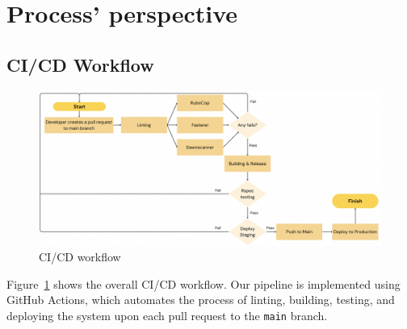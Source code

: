 




    
    



\section{Process' perspective}

\subsection{CI/CD Workflow}

\begin{figure}[H]
    \centering
    \includegraphics[width=1\linewidth]{images/Workflow.png}
    \caption{CI/CD workflow}
    \label{fig:Workflow}
\end{figure}
Figure~\ref{fig:Workflow} shows the overall CI/CD workflow. Our pipeline is implemented using GitHub Actions, which automates the process of linting, building, testing, and deploying the system upon each pull request to the \texttt{main} branch. 

